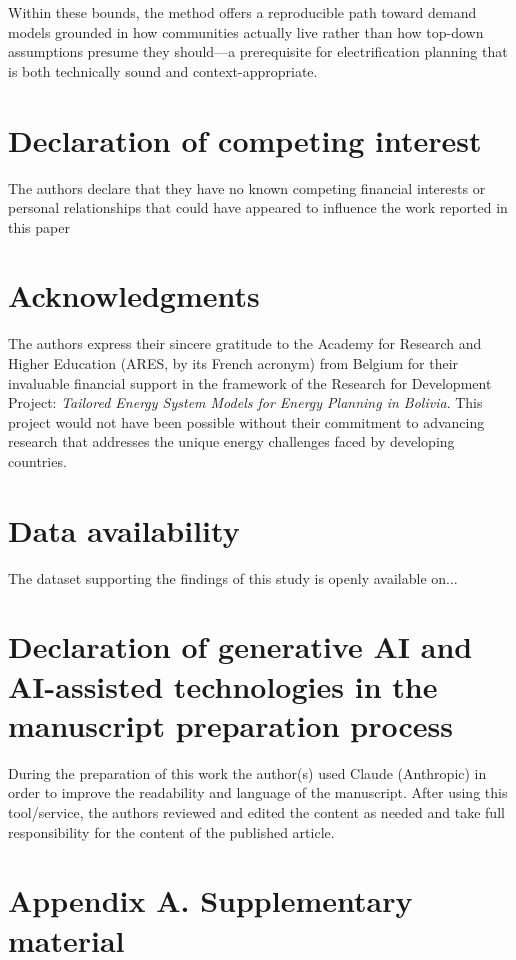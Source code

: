 \documentclass[final,3p,times,onecolumn]{elsarticle}
\begin{document}
Within these bounds, the method offers a reproducible path toward demand models grounded in how communities actually live rather than how top-down assumptions presume they should—a prerequisite for electrification planning that is both technically sound and context-appropriate.

\section*{Declaration of competing interest}
The authors declare that they have no known competing financial interests or personal relationships that could have appeared to
influence the work reported in this paper

\section*{Acknowledgments}
The authors express their sincere gratitude to the Academy for Research and Higher Education (ARES, by its French acronym) from Belgium for their invaluable financial support in the framework of the Research for Development Project: \textit{Tailored Energy System Models for Energy Planning in Bolivia}. This project would not have been possible without their commitment to advancing research that addresses the unique energy challenges faced by developing countries.

\section*{Data availability}

The dataset supporting the findings of this study is openly available on...

\section*{Declaration of generative AI and AI-assisted technologies in the manuscript preparation process}
During the preparation of this work the author(s) used Claude (Anthropic) in order to improve the readability and language of the manuscript. After using this tool/service, the authors reviewed and edited the content as needed and take full responsibility for the content of the published article.


\appendix
\section*{Appendix A. Supplementary material}
\end{document}
